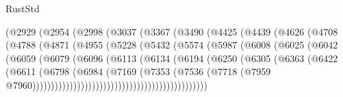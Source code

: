 \begin{lexlean}{RustStd}
\begin{coremodule}
                      (@2929
                        (@2954
                          (@2998
                            (@3037
                              (@3367
                                (@3490
                                  (@4425
                                    (@4439
                                      (@4626
                                        (@4708
                                          (@4788
                                            (@4871
                                              (@4955
                                                (@5228
                                                  (@5432
                                                    (@5574
                                                      (@5987
                                                        (@6008
                                                          (@6025
                                                            (@6042
                                                              (@6059
                                                                (@6079
                                                                  (@6096
                                                                    (@6113
                                                                      (@6134
                                                                        (@6194
                                                                          (@6250
                                                                            (@6305
                                                                              (@6363
                                                                                (@6422
                                                                                  (@6611
                                                                                    (@6798
                                                                                      (@6984
                                                                                        (@7169
                                                                                          (@7353
                                                                                            (@7536
                                                                                              (@7718
                                                                                                (@7959
                                                                                                  @7960)))))))))))))))))))))))))))))))))))))))))))))))

\end{coremodule}
\end{lexlean}
